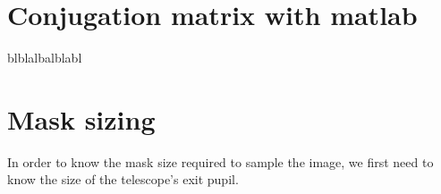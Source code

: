 \section{Conjugation matrix with matlab}
blblalbalblabl
\section{Mask sizing}\label{sec:Opti_Couille}
In order to know the mask size required to sample the image, we first need to know the size of the telescope's exit pupil.
